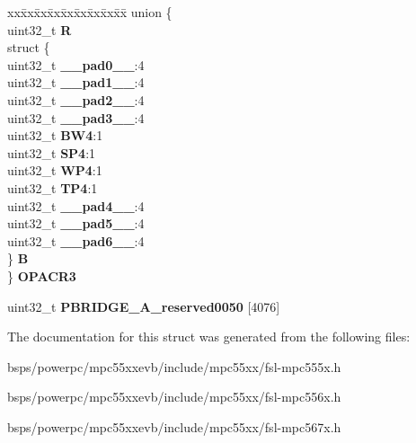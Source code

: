 \begin{DoxyCompactItemize}
\begin{tabbing}
\end{tabbing}\item 
\mbox{\label{structPBRIDGE__A__tag_a3c9790d558c59933a7d553f8d20633c4}} 
\begin{tabbing}
xx\=xx\=xx\=xx\=xx\=xx\=xx\=xx\=xx\=\kill
union \{\\
\>uint32\_t {\bfseries R}\\
\>struct \{\\
\>\>uint32\_t {\bfseries \_\_pad0\_\_}:4\\
\>\>uint32\_t {\bfseries \_\_pad1\_\_}:4\\
\>\>uint32\_t {\bfseries \_\_pad2\_\_}:4\\
\>\>uint32\_t {\bfseries \_\_pad3\_\_}:4\\
\>\>uint32\_t {\bfseries BW4}:1\\
\>\>uint32\_t {\bfseries SP4}:1\\
\>\>uint32\_t {\bfseries WP4}:1\\
\>\>uint32\_t {\bfseries TP4}:1\\
\>\>uint32\_t {\bfseries \_\_pad4\_\_}:4\\
\>\>uint32\_t {\bfseries \_\_pad5\_\_}:4\\
\>\>uint32\_t {\bfseries \_\_pad6\_\_}:4\\
\>\} {\bfseries B}\\
\} {\bfseries OPACR3}\\

\end{tabbing}\item 
\mbox{\label{structPBRIDGE__A__tag_a2aef70c80eb95b263465e0966fb6376d}} 
uint32\+\_\+t {\bfseries P\+B\+R\+I\+D\+G\+E\+\_\+\+A\+\_\+reserved0050} \mbox{[}4076\mbox{]}
\end{DoxyCompactItemize}


The documentation for this struct was generated from the following files\+:\begin{DoxyCompactItemize}
\item 
bsps/powerpc/mpc55xxevb/include/mpc55xx/fsl-\/mpc555x.\+h\item 
bsps/powerpc/mpc55xxevb/include/mpc55xx/fsl-\/mpc556x.\+h\item 
bsps/powerpc/mpc55xxevb/include/mpc55xx/fsl-\/mpc567x.\+h\end{DoxyCompactItemize}
